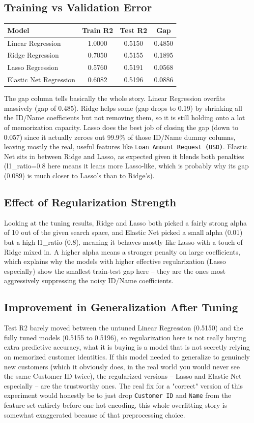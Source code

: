 \documentclass[12pt,a4paper]{article}
\begin{document}
\subsection*{Training vs Validation Error}
\begin{tabular}{lccc}
\toprule
Model & Train R2 & Test R2 & Gap \\
\midrule
Linear Regression & 1.0000 & 0.5150 & 0.4850 \\
Ridge Regression & 0.7050 & 0.5155 & 0.1895 \\
Lasso Regression & 0.5760 & 0.5191 & 0.0568 \\
Elastic Net Regression & 0.6082 & 0.5196 & 0.0886 \\
\bottomrule
\end{tabular}

The gap column tells basically the whole story. Linear Regression overfits massively (gap of 0.485). Ridge helps some (gap drops to 0.19) by shrinking all the ID/Name coefficients but not removing them, so it is still holding onto a lot of memorization capacity. Lasso does the best job of closing the gap (down to 0.057) since it actually zeroes out 99.9\% of those ID/Name dummy columns, leaving mostly the real, useful features like \texttt{Loan Amount Request (USD)}. Elastic Net sits in between Ridge and Lasso, as expected given it blends both penalties (l1\_ratio=0.8 here means it leans more Lasso-like, which is probably why its gap (0.089) is much closer to Lasso's than to Ridge's).

\subsection*{Effect of Regularization Strength}
Looking at the tuning results, Ridge and Lasso both picked a fairly strong alpha of 10 out of the given search space, and Elastic Net picked a small alpha (0.01) but a high l1\_ratio (0.8), meaning it behaves mostly like Lasso with a touch of Ridge mixed in. A higher alpha means a stronger penalty on large coefficients, which explains why the models with higher effective regularization (Lasso especially) show the smallest train-test gap here -- they are the ones most aggressively suppressing the noisy ID/Name coefficients.

\subsection*{Improvement in Generalization After Tuning}
Test R2 barely moved between the untuned Linear Regression (0.5150) and the fully tuned models (0.5155 to 0.5196), so regularization here is not really buying extra predictive accuracy, what it is buying is a model that is not secretly relying on memorized customer identities. If this model needed to generalize to genuinely new customers (which it obviously does, in the real world you would never see the same Customer ID twice), the regularized versions -- Lasso and Elastic Net especially -- are the trustworthy ones. The real fix for a "correct" version of this experiment would honestly be to just drop \texttt{Customer ID} and \texttt{Name} from the feature set entirely before one-hot encoding, this whole overfitting story is somewhat exaggerated because of that preprocessing choice.
\end{document}
